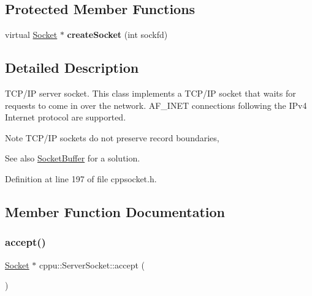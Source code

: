 \subsection*{Protected Member Functions}
\begin{DoxyCompactItemize}
\item 
\mbox{\label{classcppu_1_1_server_socket_a23d038275576d0a969072eb334f7b84f}} 
virtual \mbox{\hyperlink{classcppu_1_1_socket}{Socket}} $\ast$ {\bfseries create\+Socket} (int sockfd)
\end{DoxyCompactItemize}


\subsection{Detailed Description}
T\+C\+P/\+IP server socket. This class implements a T\+C\+P/\+IP socket that waits for requests to come in over the network. A\+F\+\_\+\+I\+N\+ET connections following the I\+Pv4 Internet protocol are supported. 

\begin{DoxyNote}{Note}
T\+C\+P/\+IP sockets do not preserve record boundaries, 
\end{DoxyNote}
\begin{DoxySeeAlso}{See also}
\mbox{\hyperlink{classcppu_1_1_socket_buffer}{Socket\+Buffer}} for a solution. 
\end{DoxySeeAlso}


Definition at line 197 of file cppsocket.\+h.



\subsection{Member Function Documentation}
\mbox{\label{classcppu_1_1_server_socket_af08ebcb886fc778d195fb622f7b96b8b}} 
\subsubsection{\texorpdfstring{accept()}{accept()}}
{\footnotesize\ttfamily \mbox{\hyperlink{classcppu_1_1_socket}{Socket}} $\ast$ cppu\+::\+Server\+Socket\+::accept (\begin{DoxyParamCaption}{ }\end{DoxyParamCaption})\hspace{0.3cm}{\ttfamily [virtual]}}



